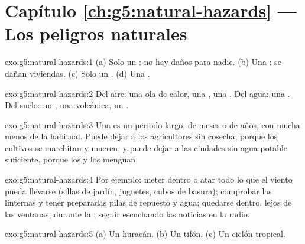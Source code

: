 \section*{Capítulo \ref{ch:g5:natural-hazards} --- Los peligros naturales}

\begin{solution}{exo:g5:natural-hazards:1}
(a) Solo un : no hay daños para nadie. (b) Una : se dañan viviendas. (c) Solo un . (d) Una
.
\end{solution}

\begin{solution}{exo:g5:natural-hazards:2}
Del aire: una ola de calor, una , una . Del agua: una
. Del suelo: un , una  volcánica,
un .
\end{solution}

\begin{solution}{exo:g5:natural-hazards:3}
Una  es un periodo largo, de meses o de años, con mucha menos 
de la habitual. Puede dejar a los agricultores sin cosecha, porque los
cultivos se marchitan y mueren, y puede dejar a las ciudades sin agua
potable suficiente, porque los  y los  menguan.
\end{solution}

\begin{solution}{exo:g5:natural-hazards:4}
Por ejemplo: meter dentro o atar todo lo que el viento pueda llevarse
(sillas de jardín, juguetes, cubos de basura); comprobar las linternas y
tener preparadas pilas de repuesto y agua; quedarse dentro, lejos de las
ventanas, durante la ; seguir escuchando las noticias en la radio.
\end{solution}

\begin{solution}{exo:g5:natural-hazards:5}
(a) Un huracán. (b) Un tifón. (c) Un ciclón tropical.
\end{solution}

